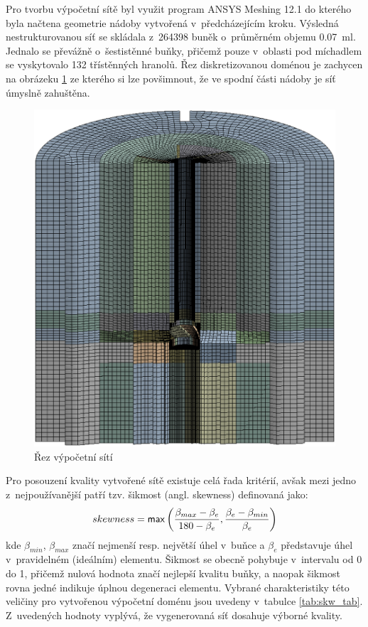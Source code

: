 Pro tvorbu výpočetní sítě byl využit program ANSYS Meshing 12.1 do kterého byla načtena geometrie nádoby vytvořená v~předcházejícím kroku. Výsledná nestrukturovanou síť se skládala z~\num{264398} buněk o~průměrném objemu \SI{0.07}{\milli\litre}. Jednalo se převážně o~šestistěnné buňky, přičemž pouze v~oblasti pod míchadlem se vyskytovalo \num{132} třístěnných hranolů. Řez diskretizovanou doménou je zachycen na obrázeku \ref{fig:mesh} ze kterého si lze povšimnout, že ve spodní části nádoby je síť úmyslně zahuštěna. 
\begin{figure}[t]
\centering
\includegraphics[scale=0.28]{images/mesh.eps}
\caption{Řez výpočetní sítí}
\label{fig:mesh}
\end{figure} 
Pro posouzení kvality vytvořené sítě existuje celá řada kritérií, avšak mezi jedno z~nejpoužívanější patří tzv. šikmost (angl. skewness) definovaná jako:
\begin{equation}
      skewness = \mathsf{max}\left( \frac{\beta_{max} - \beta_{e}}{180 - \beta_{e}}, \frac{\beta_{e} - \beta_{min}}{\beta_{e}} \right)
  	\label{eq:skw}
\end{equation} 
kde $\beta_{min}$, $\beta_{max}$ značí nejmenší resp. největší úhel v~buňce a $\beta_{e}$ představuje úhel v~pravidelném (ideálním) elementu. Šikmost se obecně pohybuje v~intervalu od \num{0} do \num{1}, přičemž nulová hodnota značí nejlepší kvalitu buňky, a naopak šikmost rovna jedné indikuje úplnou degeneraci elementu. Vybrané charakteristiky této veličiny pro vytvořenou výpočetní doménu jsou uvedeny v~tabulce \ref{tab:skw_tab}. Z~uvedených hodnoty vyplývá, že vygenerovaná síť dosahuje výborné kvality.
